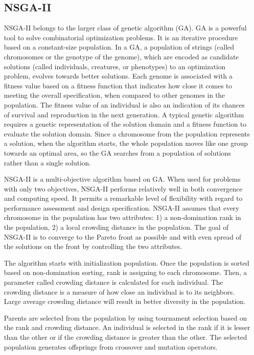 \documentclass{llncs}
\begin{document}
\subsection{NSGA-II}
NSGA-II \cite{996017} belongs to the larger class of genetic algorithm (GA). GA \cite{man1996genetic} is a powerful tool to solve combinatorial optimization problems. It is an iterative procedure based on a constant-size population. In a GA, a population of strings (called chromosomes
or the genotype of the genome), which are encoded as candidate solutions (called individuals, creatures, or phenotypes) to an optimization problem, evolves towards better solutions. 
Each genome is associated with a fitness value based on a fitness function that indicates how close it comes to meeting the overall specification, when compared to other genomes in the
population. The fitness value of an individual is also an indication of its chances of survival and reproduction in the next generation. A typical genetic algorithm requires a genetic
representation of the solution domain and a fitness function to evaluate the solution domain. Since a chromosome from the population represents a solution, when the algorithm starts, 
the whole population moves like one group towards an optimal area, so the GA searches from a population of solutions rather than a single solution.

NSGA-II is a multi-objective algorithm based on GA. When used for problems with only two objectives, NSGA-II performs 
relatively well in both convergence and  computing speed. It permits a remarkable level of flexibility with regard to 
performance assessment and design specification. NSGA-II assumes that every chromosome in the population has two 
attributes: 1) a non-domination rank in the population, 2) a local crowding distance in the population. The goal of 
NSGA-II is to converge to the Pareto front as possible and with even spread of the solutions on the front by 
controlling the two attributes. 

The algorithm starts with initialization population. Once the population is sorted based on non-domination sorting, rank is assigning to each chromosome.
Then, a parameter called crowding distance is calculated for each individual. The crowding distance is a measure of how close an individual is to its neighbors. Large 
average crowding distance will result in better diversity in the population. 

Parents are selected from the population by using tournament selection based on the rank and crowding distance. An individual is selected in the rank if it is lesser than the other or 
if the crowding distance is greater than the other. The selected population generates offsprings from crossover and mutation operators. 
\end{document}
